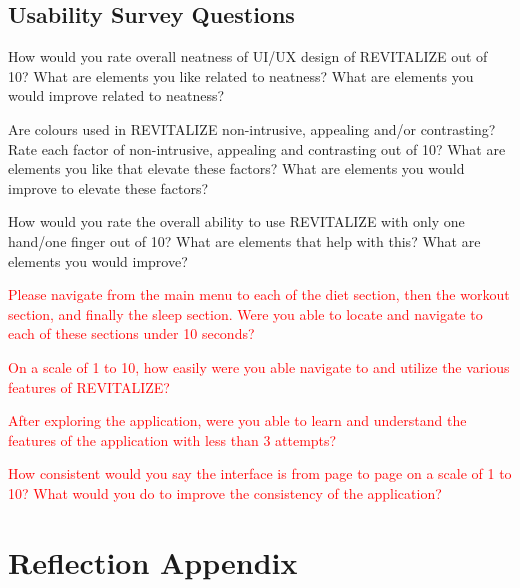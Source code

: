 \documentclass[12pt, titlepage]{article}
\begin{document}

\subsection{Usability Survey Questions}

\begin{enumerate}
	\hypertarget{q1}{\item} How would you rate overall neatness of UI/UX design of REVITALIZE out of 10? What are elements you like related to neatness? What are elements you would improve related to neatness?
	\hypertarget{q2}{\item} Are colours used in REVITALIZE non-intrusive, appealing and/or contrasting? Rate each factor of non-intrusive, appealing and contrasting out of 10? What are elements you like that elevate these factors? What are elements you would improve to elevate these factors?
	\hypertarget{q3}{\item} How would you rate the overall ability to use REVITALIZE with only one hand/one finger out of 10? What are elements that help with this? What are elements you would improve?
	
	\hypertarget{q4}{\item} \textcolor{red}{Please navigate from the main menu to each of the diet section, then the workout section, and finally the sleep section. Were you able to locate and navigate to each of these sections under 10 seconds?}

	\hypertarget{q5}{\item} \textcolor{red}{On a scale of 1 to 10, how easily were you able navigate to and utilize the various features of REVITALIZE?}

	\hypertarget{q6}{\item} \textcolor{red}{After exploring the application, were you able to learn and understand the features of the application with less than 3 attempts?}

	\hypertarget{q7}{\item} \textcolor{red}{How consistent would you say the interface is from page to page on a scale of 1 to 10? What would you do to improve the consistency of the application?}
\end{enumerate}

\section{Reflection Appendix}
\end{document}
